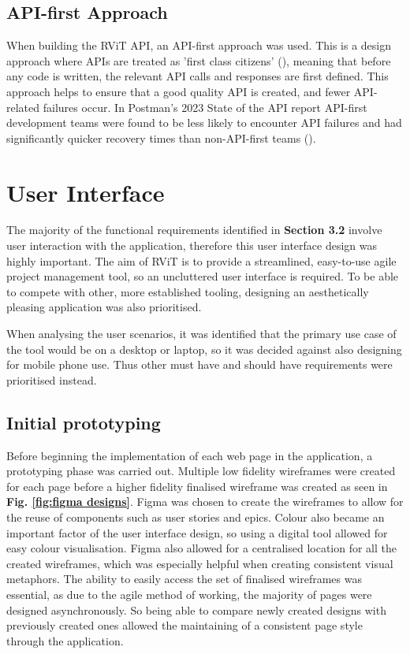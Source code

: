 \documentclass[l4proj.tex]{subfiles}
\begin{document}
\subsection{API-first Approach}
When building the RViT API, an API-first approach was used. This is a design approach where APIs are treated as 'first class citizens' (\cite{Wagner(Swagger)}), meaning that before any code is written, the relevant API calls and responses are first defined. This approach helps to ensure that a good quality API is created, and fewer API-related failures occur. In Postman's 2023 State of the API report API-first development teams were found to be less likely to encounter API failures and had significantly quicker recovery times than non-API-first teams (\cite{PostmanAPIFirst}). 


\section{User Interface}
The majority of the functional requirements identified in \textbf{Section 3.2} involve user interaction with the application, therefore this user interface design was highly important. The aim of RViT is to provide a streamlined, easy-to-use agile project management tool, so an uncluttered user interface is required. To be able to compete with other, more established tooling, designing an aesthetically pleasing application was also prioritised. 

When analysing the user scenarios, it was identified that the primary use case of the tool would be on a desktop or laptop, so it was decided against also designing for mobile phone use. Thus other must have and should have requirements were prioritised instead.


\subsection{Initial prototyping}
Before beginning the implementation of each web page in the application, a prototyping phase was carried out. Multiple low fidelity wireframes were created for each page before a higher fidelity finalised wireframe was created as seen in \textbf{Fig. \ref{fig:figma designs}}. Figma was chosen to create the wireframes to allow for the reuse of components such as user stories and epics. Colour also became an important factor of the user interface design, so using a digital tool allowed for easy colour visualisation. Figma also allowed for a centralised location for all the created wireframes, which was especially helpful when creating consistent visual metaphors. The ability to easily access the set of finalised wireframes was essential, as due to the agile method of working, the majority of pages were designed asynchronously. So being able to compare newly created designs with previously created ones allowed the maintaining of a consistent page style through the application. 
\end{document}
